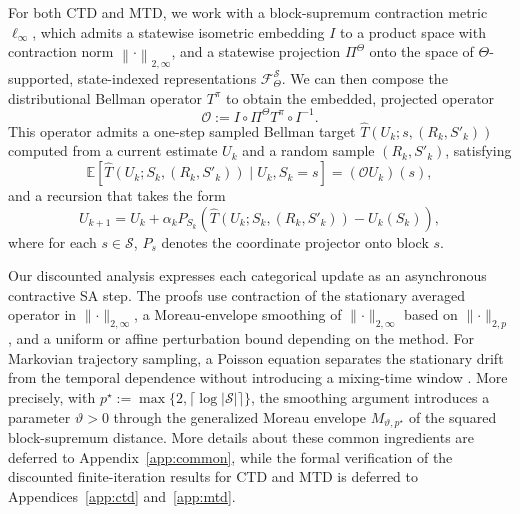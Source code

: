 \documentclass{article}
\newcommand{\X}{\mathcal{S}}
\newcommand{\E}{\mathbb{E}}
\newcommand{\norm}[1]{\left\lVert #1 \right\rVert}
\begin{document}
For both CTD and MTD, we work with a block-supremum contraction metric $\ell_\infty$, which admits a statewise isometric embedding $I$ to a product space with contraction norm $\norm{\cdot}_{2,\infty}$, and a statewise projection $\Pi^\Theta$ onto the space of $\Theta$-supported, state-indexed representations $\mathcal F^\X_\Theta$. We can then compose the distributional Bellman operator $T^\pi$ to obtain the embedded, projected operator
\begin{equation}
\mathcal O := I \circ \Pi^\Theta T^\pi \circ I^{-1}.
\end{equation}
This operator admits a one-step sampled Bellman target $\widehat T(U_k;s,(R_k, S'_k))$ computed from a current estimate $U_k$ and a random sample $(R_k, S'_k)$, satisfying
\begin{equation}
\E \left[ \widehat T(U_k; S_k, (R_k, S'_k)) \mid U_k, S_k =s\right] = (\mathcal O U_k)(s),
\end{equation}
and a recursion that takes the form
\begin{equation}\label{eq:recursion}
U_{k+1} = U_k + \alpha_k P_{S_k} (\widehat T(U_k; S_k, (R_k, S'_k)) - U_k(S_k)),
\end{equation}
where for each $s \in \X$, $P_s$ denotes the coordinate projector onto block $s$.

Our discounted analysis expresses each categorical update as an asynchronous contractive SA step. The proofs use contraction of the stationary averaged operator in $\lVert \cdot \rVert_{2,\infty}$, a Moreau-envelope smoothing of $\lVert \cdot \rVert_{2,\infty}$ based on $\lVert \cdot \rVert_{2,p}$ \citep{borkar2008stochastic,kushner2003stochastic,beck2017first,moreau1965proximite,bauschke2017convex}, and a uniform or affine perturbation bound depending on the method. For Markovian trajectory sampling, a Poisson equation separates the stationary drift from the temporal dependence without introducing a mixing-time window \citep{haque2024stochastic}. More precisely, with $p^\star := \max\{2,\lceil \log \lvert \X \rvert\rceil\}$, the smoothing argument introduces a parameter $\vartheta>0$ through the generalized Moreau envelope $M_{\vartheta,p^\star}$ of the squared block-supremum distance. More details about these common ingredients are deferred to Appendix~\ref{app:common}, while the formal verification of the discounted finite-iteration results for CTD and MTD is deferred to Appendices~\ref{app:ctd} and~\ref{app:mtd}.
\end{document}

